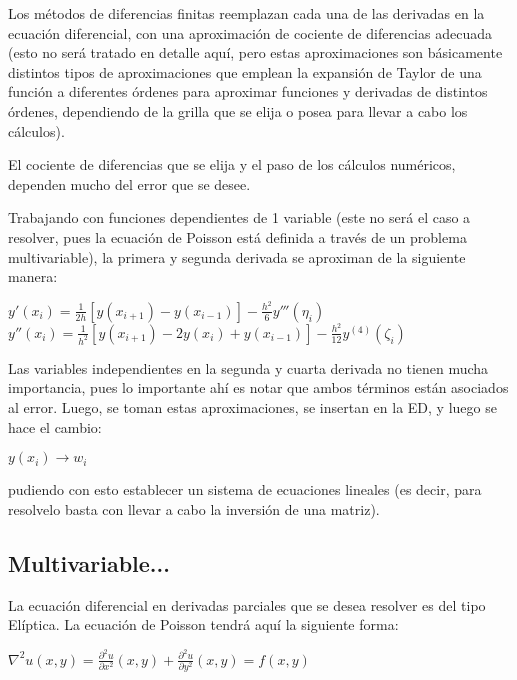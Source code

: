 \documentclass[letter]{article}
\begin{document}
Los métodos de diferencias finitas reemplazan cada una de las derivadas en la ecuación diferencial, con una aproximación de cociente de diferencias adecuada (esto no será tratado en detalle aquí, pero estas aproximaciones son básicamente distintos tipos de aproximaciones que emplean la expansión de Taylor de una función a diferentes órdenes para aproximar funciones y derivadas de distintos órdenes, dependiendo de la grilla que se elija o posea para llevar a cabo los cálculos).

El cociente de diferencias que se elija y el paso de los cálculos numéricos, dependen mucho del error que se desee.

Trabajando con funciones dependientes de 1 variable (este no será el caso a resolver, pues la ecuación de Poisson está definida a través de un problema multivariable), la primera y segunda derivada se aproximan de la siguiente manera:

\begin{center}
$\displaystyle y'(x_{i})=\frac{1}{2h}[y(x_{i+1})-y(x_{i-1})]-\frac{h^{2}}{6}y'''(\eta_{i})$\\
$\displaystyle y''(x_{i})=\frac{1}{h^{2}}[y(x_{i+1})-2y(x_{i})+y(x_{i-1})]-\frac{h^{2}}{12}y^{(4)}(\zeta_{i})$
\end{center}

Las variables independientes en la segunda y cuarta derivada no tienen mucha importancia, pues lo importante ahí es notar que ambos términos están asociados al error. Luego, se toman estas aproximaciones, se insertan en la ED, y luego se hace el cambio:

\begin{center}
$\displaystyle y(x_{i})\rightarrow w_{i}$
\end{center}

pudiendo con esto establecer un sistema de ecuaciones lineales (es decir, para resolvelo basta con llevar a cabo la inversión de una matriz).

\subsection{Multivariable...}
La ecuación diferencial en derivadas parciales que se desea resolver es del tipo Elíptica. La ecuación de Poisson tendrá aquí la siguiente forma:

\begin{center}
$\displaystyle \nabla^{2}u(x,y)=\frac{\partial^{2}u}{\partial x^{2}}(x,y)+\frac{\partial^{2}u}{\partial y^{2}}(x,y)=f(x,y)$
\end{center}
\end{document}
